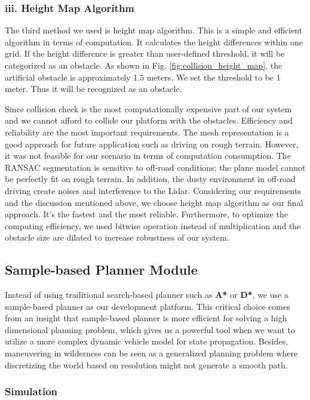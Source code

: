 \documentclass[../thesis.tex]{subfiles}
\begin{document}
\subsubsection{iii. Height Map Algorithm}
The third method we used is height map algorithm. This is a simple and efficient algorithm in terms of computation. It calculates the height differences within one grid. If the height difference is greater than user-defined threshold, it will be categorized as an obstacle. As shown in Fig. \ref{fig:collision_height_map}, the artificial obstacle is approximately 1.5 meters. We set the threshold to be 1 meter. Thus it will be recognized as an obstacle. 

Since collision check is the most computationally expensive part of our system and we cannot afford to collide our platform with the obstacles. Efficiency and reliability are the most important requirements. The mesh representation is a good approach for future application such as driving on rough terrain. However, it was not feasible for our scenario in terms of computation consumption. The RANSAC segmentation is sensitive to off-road conditions; the plane model cannot be perfectly fit on rough terrain. In addition, the dusty environment in off-road driving create noises and interference to the Lidar. Considering our requirements and the discussion mentioned above, we choose height map algorithm as our final approach. It’s the fastest and the most reliable. Furthermore, to optimize the computing efficiency, we used bitwise operation instead of multiplication and the obstacle size are dilated to increase robustness of our system. 

\subsection{Sample-based Planner Module}

Instead of using traditional search-based planner such as \textbf{A*} or \textbf{D*}, we use a sample-based planner as our development platform. This critical choice comes from an insight that sample-based planner is more efficient for solving a high dimensional planning problem, which gives us a powerful tool when we want to utilize a more complex dynamic vehicle model for state propagation. Besides, maneuvering in wilderness can be seen as a generalized planning problem where discretizing the world based on resolution might not generate a smooth path.

\subsubsection{Simulation}
\end{document}
